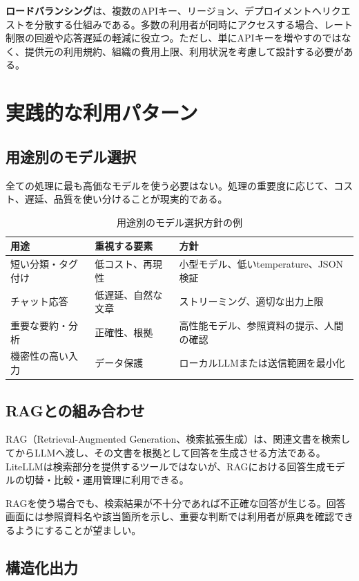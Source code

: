 \documentclass[a4paper,11pt]{jsarticle}
\begin{document}
\textbf{ロードバランシング}は、複数のAPIキー、リージョン、デプロイメントへリクエストを分散する仕組みである。多数の利用者が同時にアクセスする場合、レート制限の回避や応答遅延の軽減に役立つ。ただし、単にAPIキーを増やすのではなく、提供元の利用規約、組織の費用上限、利用状況を考慮して設計する必要がある。

\section{実践的な利用パターン}

\subsection{用途別のモデル選択}

全ての処理に最も高価なモデルを使う必要はない。処理の重要度に応じて、コスト、遅延、品質を使い分けることが現実的である。

\begin{table}[tbp]
\centering
\caption{用途別のモデル選択方針の例}
\begin{tabular}{p{42mm}p{43mm}p{54mm}}
\toprule
用途 & 重視する要素 & 方針 \\
\midrule
短い分類・タグ付け & 低コスト、再現性 & 小型モデル、低いtemperature、JSON検証 \\
チャット応答 & 低遅延、自然な文章 & ストリーミング、適切な出力上限 \\
重要な要約・分析 & 正確性、根拠 & 高性能モデル、参照資料の提示、人間の確認 \\
機密性の高い入力 & データ保護 & ローカルLLMまたは送信範囲を最小化 \\
\bottomrule
\end{tabular}
\end{table}

\subsection{RAGとの組み合わせ}

RAG（Retrieval-Augmented Generation、検索拡張生成）は、関連文書を検索してからLLMへ渡し、その文書を根拠として回答を生成させる方法である。LiteLLMは検索部分を提供するツールではないが、RAGにおける回答生成モデルの切替・比較・運用管理に利用できる。

RAGを使う場合でも、検索結果が不十分であれば不正確な回答が生じる。回答画面には参照資料名や該当箇所を示し、重要な判断では利用者が原典を確認できるようにすることが望ましい。

\subsection{構造化出力}
\end{document}
